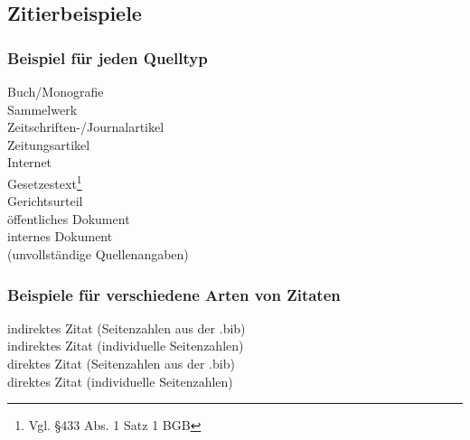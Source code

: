 \subsection{Zitierbeispiele}
\subsubsection{Beispiel für jeden Quelltyp}%

Buch/Monografie\\
Sammelwerk\\
Zeitschriften-/Journalartikel\\
Zeitungsartikel\\
Internet\\%
Gesetzestext\footnote{Vgl. §433 Abs. 1 Satz 1 BGB}\nocite{bgb}\\
Gerichtsurteil\\
öffentliches Dokument\\
internes Dokument\\%
(unvollständige Quellenangaben)

\newpage
\subsubsection{Beispiele für verschiedene Arten von Zitaten}%

indirektes Zitat (Seitenzahlen aus der .bib)\\%
indirektes Zitat (individuelle Seitenzahlen)\\%
direktes Zitat (Seitenzahlen aus der .bib)\\%
direktes Zitat (individuelle Seitenzahlen)

